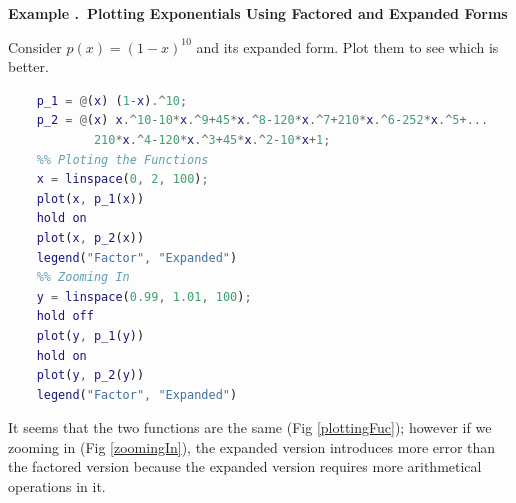 \documentclass[12pt, a4paper]{article}
\newcounter{index}[subsection]
\newenvironment*{eg}[1]{\begin{framed}\par\noindent\textbf{Example \thesubsection.\stepcounter{index}\theindex\ #1} \par}{\par\end{framed}}
\begin{document}
\begin{eg}{Plotting Exponentials Using Factored and Expanded Forms}
	Consider $p(x)=(1-x)^{10}$ and its expanded form.
	Plot them to see which is better. 
	\begin{lstlisting}[language = Matlab, title = {Example 1.4.5}]
	%% Defining the Functions
	p_1 = @(x) (1-x).^10;
	p_2 = @(x) x.^10-10*x.^9+45*x.^8-120*x.^7+210*x.^6-252*x.^5+...
			210*x.^4-120*x.^3+45*x.^2-10*x+1;
	%% Ploting the Functions
	x = linspace(0, 2, 100);
	plot(x, p_1(x))
	hold on
	plot(x, p_2(x))
	legend("Factor", "Expanded")
	%% Zooming In
	y = linspace(0.99, 1.01, 100);
	hold off
	plot(y, p_1(y))
	hold on
	plot(y, p_2(y))
	legend("Factor", "Expanded")
	\end{lstlisting}
	\begin{figure}[H]\centering
	\hfill
	\end{figure}
	It seems that the two functions are the same (Fig \ref{plottingFuc}); however if we zooming in (Fig \ref{zoomingIn}), the expanded version introduces more error than the factored version because the expanded version requires more arithmetical operations in it. 
	\end{eg}
\end{document}
